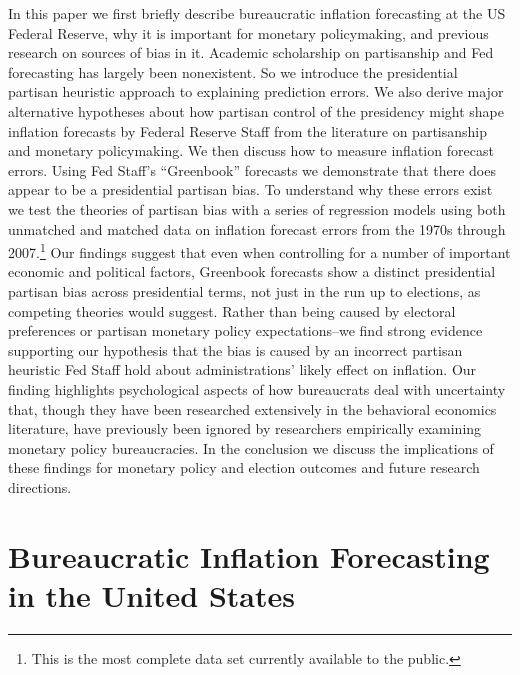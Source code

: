 \documentclass[a4paper]{article}\usepackage{graphicx, color}
\begin{document}
In this paper we first briefly describe bureaucratic inflation forecasting at the US Federal Reserve, why it is important for monetary policymaking, and previous research on sources of bias in it. Academic scholarship on partisanship and Fed forecasting has largely been nonexistent. So we introduce the presidential partisan heuristic approach to explaining prediction errors. We also derive major alternative hypotheses about how partisan control of the presidency might shape inflation forecasts by Federal Reserve Staff from the literature on partisanship and monetary policymaking. We then discuss how to measure inflation forecast errors. Using Fed Staff's ``Greenbook'' forecasts we demonstrate that there does appear to be a presidential partisan bias. To understand why these errors exist we test the theories of partisan bias with a series of regression models using both unmatched and matched data on inflation forecast errors from the 1970s through 2007.\footnote{This is the most complete data set currently available to the public.} Our findings suggest that even when controlling for a number of important economic and political factors, Greenbook forecasts show a distinct presidential partisan bias across presidential terms, not just in the run up to elections, as competing theories would suggest. Rather than being caused by electoral preferences or partisan monetary policy expectations--we find strong evidence supporting our hypothesis that the bias is caused by an incorrect partisan heuristic Fed Staff hold about administrations' likely effect on inflation. Our finding highlights psychological aspects of how bureaucrats deal with uncertainty that, though they have been researched extensively in the behavioral economics literature, have previously been ignored by researchers empirically examining monetary policy bureaucracies. In the conclusion we discuss the implications of these findings for monetary policy and election outcomes and future research directions. 


\section{Bureaucratic Inflation Forecasting in the United States}
\end{document}

